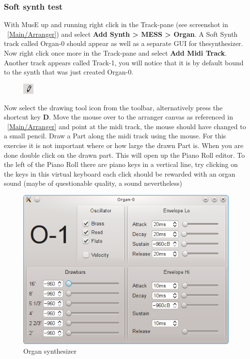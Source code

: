 \documentclass[a4paper]{report}
\newcommand{\key}[1]{\textbf{#1}}
\newcommand{\menu}[1]{\textbf{#1}}
\begin{document}
\subsubsection {Soft synth test}
With MusE up and running right click in the Track-pane (see screenshot in
~\ref{Main/Arranger}) and select \menu{Add Synth > MESS > Organ}. A Soft
Synth track called Organ-0 should appear as well as a separate GUI for
thesynthesizer.\\
Now right click once more in the Track-pane and select \menu{Add Midi
Track}. Another track appears called Track-1, you will notice that it is
by default bound to the synth that was just created Organ-0.
\begin{figure}
\includegraphics[width=0.05\textwidth]{pics/arrow_tool}
\end{figure}
Now select the drawing tool icon
from the toolbar, alternatively press the shortcut key \key{D}.
Move the mouse over to the arranger canvas as referenced in ~\ref{Main/Arranger}
and point at the midi track, the mouse should have changed to a small pencil.
Draw a Part along the midi track using the mouse. For this exercise it is
not important where or how large the drawn Part is. When you are done double
click on the drawn part. This will open up the Piano Roll editor. To the
left of the Piano Roll there are piano keys in a vertical line, try clicking
on the keys in this virtual keyboard each click should be rewarded with an
organ sound (maybe of questionable quality, a sound nevertheless)
\begin{figure}[htp]
\centering
\includegraphics[width=.5\textwidth]{pics/organ_synth}
\caption{Organ synthesizer}
\label{fig:organ_synth}
\end{figure}
\end{document}
